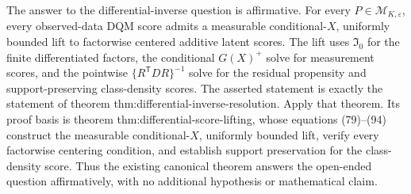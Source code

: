 The answer to the differential-inverse question is affirmative.  For every \(P\in\mathcal M_{K,\varepsilon}\), every observed-data DQM score admits a measurable conditional-\(X\), uniformly bounded lift to factorwise centered additive latent scores.  The lift uses \(\mathfrak I_0\) for the finite differentiated factors, the conditional \(G(X)^+\) solve for measurement scores, and the pointwise \(\{R^{\mathsf T}DR\}^{-1}\) solve for the residual propensity and support-preserving class-density scores.
The asserted statement is exactly the statement of theorem thm:differential-inverse-resolution.  Apply that theorem.  Its proof basis is theorem thm:differential-score-lifting, whose equations (79)--(94) construct the measurable conditional-\(X\), uniformly bounded lift, verify every factorwise centering condition, and establish support preservation for the class-density score.  Thus the existing canonical theorem answers the open-ended question affirmatively, with no additional hypothesis or mathematical claim.
